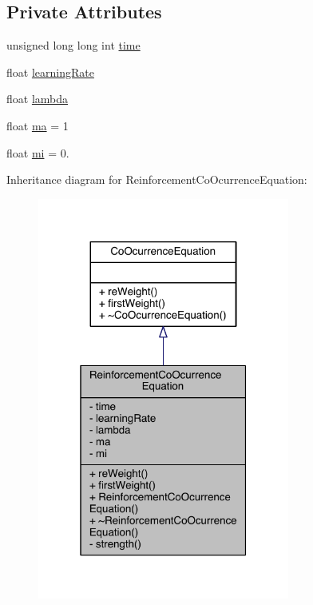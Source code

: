 \subsection*{Private Attributes}
\begin{DoxyCompactItemize}
\item 
unsigned long long int \hyperlink{class_reinforcement_co_ocurrence_equation_a12eb56a8fb3b21e292b9cd5030efda0f}{time}
\item 
float \hyperlink{class_reinforcement_co_ocurrence_equation_a643eafe5a80172a58cd54512e57d3421}{learning\+Rate}
\item 
float \hyperlink{class_reinforcement_co_ocurrence_equation_a698939519d58a0da4a079822a1d65e87}{lambda}
\item 
float \hyperlink{class_reinforcement_co_ocurrence_equation_ac25055b41571d4b146d2fd0695e642ba}{ma} = 1
\item 
float \hyperlink{class_reinforcement_co_ocurrence_equation_a31a1e4a2ba8239ddb2c08f7d24f30e29}{mi} = 0.
\end{DoxyCompactItemize}


Inheritance diagram for Reinforcement\+Co\+Ocurrence\+Equation\+:\nopagebreak
\begin{figure}[H]
\begin{center}
\leavevmode
\includegraphics[width=235pt]{class_reinforcement_co_ocurrence_equation__inherit__graph}
\end{center}
\end{figure}


